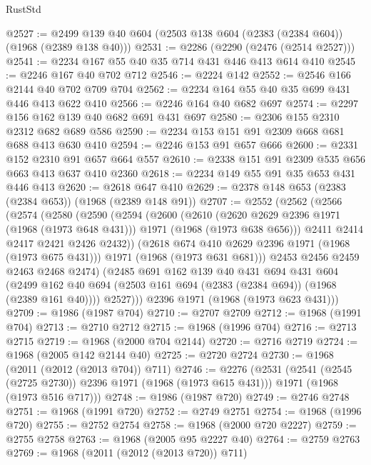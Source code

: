 \begin{lexlean}{RustStd}
\begin{coremodule}
@2527 := @2499 @139 @40 @604 (@2503 @138 @604 (@2383 (@2384 @604)) (@1968 (@2389 @138 @40)))
@2531 := @2286 (@2290 (@2476 (@2514 @2527)))
@2541 := @2234 @167 @55 @40 @35 @714 @431 @446 @413 @614 @410
@2545 := @2246 @167 @40 @702 @712
@2546 := @2224 @142
@2552 := @2546 @166 @2144 @40 @702 @709 @704
@2562 := @2234 @164 @55 @40 @35 @699 @431 @446 @413 @622 @410
@2566 := @2246 @164 @40 @682 @697
@2574 := @2297 @156 @162 @139 @40 @682 @691 @431 @697
@2580 := @2306 @155 @2310 @2312 @682 @689 @586
@2590 := @2234 @153 @151 @91 @2309 @668 @681 @688 @413 @630 @410
@2594 := @2246 @153 @91 @657 @666
@2600 := @2331 @152 @2310 @91 @657 @664 @557
@2610 := @2338 @151 @91 @2309 @535 @656 @663 @413 @637 @410 @2360
@2618 := @2234 @149 @55 @91 @35 @653 @431 @446 @413
@2620 := @2618 @647 @410
@2629 := @2378 @148 @653 (@2383 (@2384 @653)) (@1968 (@2389 @148 @91))
@2707 := @2552
    (@2562
      (@2566
        (@2574
          (@2580
            (@2590
              (@2594
                (@2600
                  (@2610
                    (@2620 @2629 @2396 @1971 (@1968 (@1973 @648 @431)))
                    @1971
                    (@1968 (@1973 @638 @656)))
                  @2411
                  @2414
                  @2417
                  @2421
                  @2426
                  @2432))
              (@2618 @674 @410 @2629 @2396 @1971 (@1968 (@1973 @675 @431)))
              @1971
              (@1968 (@1973 @631 @681)))
            @2453
            @2456
            @2459
            @2463
            @2468
            @2474)
          (@2485
            @691
            @162
            @139
            @40
            @431
            @694
            @431
            @604
            (@2499 @162 @40 @694 (@2503 @161 @694 (@2383 (@2384 @694)) (@1968 (@2389 @161 @40))))
            @2527)))
      @2396
      @1971
      (@1968 (@1973 @623 @431)))
@2709 := @1986 (@1987 @704)
@2710 := @2707 @2709
@2712 := @1968 (@1991 @704)
@2713 := @2710 @2712
@2715 := @1968 (@1996 @704)
@2716 := @2713 @2715
@2719 := @1968 (@2000 @704 @2144)
@2720 := @2716 @2719
@2724 := @1968 (@2005 @142 @2144 @40)
@2725 := @2720 @2724
@2730 := @1968 (@2011 (@2012 (@2013 @704)) @711)
@2746 := @2276
    (@2531
      (@2541 (@2545 (@2725 @2730)) @2396 @1971 (@1968 (@1973 @615 @431)))
      @1971
      (@1968 (@1973 @516 @717)))
@2748 := @1986 (@1987 @720)
@2749 := @2746 @2748
@2751 := @1968 (@1991 @720)
@2752 := @2749 @2751
@2754 := @1968 (@1996 @720)
@2755 := @2752 @2754
@2758 := @1968 (@2000 @720 @2227)
@2759 := @2755 @2758
@2763 := @1968 (@2005 @95 @2227 @40)
@2764 := @2759 @2763
@2769 := @1968 (@2011 (@2012 (@2013 @720)) @711)

\end{coremodule}
\end{lexlean}
